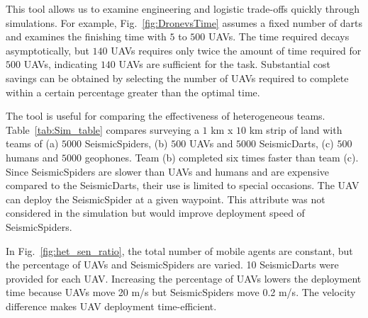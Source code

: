This tool allows us to examine engineering and logistic trade-offs quickly through simulations.  For example, Fig.~\ref{fig:DronevsTime} assumes a fixed number of darts and examines the finishing time with $5$ to $500$ UAVs.  The time required decays asymptotically, but $140$ UAVs requires only twice the amount of time required for $500$ UAVs, indicating  $140$ UAVs are sufficient for the task.    
 Substantial cost savings can be obtained by selecting the number of UAVs required to complete within a certain percentage greater than the optimal time.

The tool is useful for comparing the effectiveness of heterogeneous teams.  Table~\ref{tab:Sim_table} compares surveying a $1$ km x $10$ km strip of land with teams of (a) $5000$ SeismicSpiders, (b) $500$ UAVs and $5000$ SeismicDarts, (c) $500$ humans and $5000$ geophones.  Team (b) completed six times faster than team (c). 
  Since SeismicSpiders are  slower than UAVs and humans and are expensive compared to the SeismicDarts, their use is limited to special occasions. The UAV can deploy the SeismicSpider at a given waypoint. This attribute was not considered in the simulation but would improve deployment speed of SeismicSpiders.
   
In Fig.~\ref{fig:het_sen_ratio}, the total number of mobile agents are constant, but the percentage of UAVs and SeismicSpiders are varied.  10 SeismicDarts were provided for each UAV. Increasing the percentage of UAVs lowers the deployment time because UAVs move 20 m/s but SeismicSpiders move 0.2 m/s. 
The velocity difference makes UAV deployment time-efficient. 
